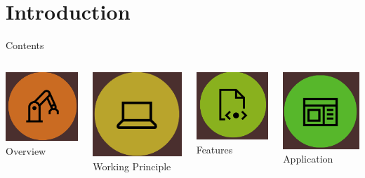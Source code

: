 \documentclass{if-beamer}
\begin{document}
\section{Introduction}
\begin{frame}{Contents}
\begin{columns}
\begin{column}{0.25\textwidth}
\centering
\includegraphics[scale=0.5]{figuras/kimbo.png}
Overview
\end{column}

\begin{column}{0.25\textwidth}
\centering
\includegraphics[scale=0.5]{figuras/pc.png}
Working Principle

\end{column}

\begin{column}{0.25\textwidth}

\centering
\includegraphics[scale=0.5]{figuras/code.png}
Features

\end{column}
\begin{column}{0.25\textwidth}
\centering
\includegraphics[scale=0.5]{figuras/app.png}
Application

\end{column}
\end{columns}
\end{frame}
\end{document}
